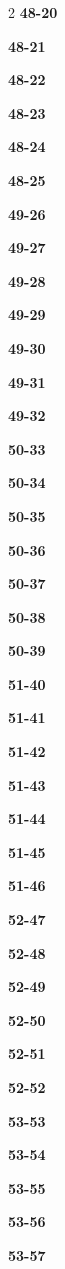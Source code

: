 \documentclass[10pt,a4paper]{article}
\begin{document}
\begin{multicols}{2}
\noindent\textbf{48-20}\ \par
\noindent\textbf{48-21}\ \par
\noindent\textbf{48-22}\ \par
\noindent\textbf{48-23}\ \par
\noindent\textbf{48-24}\ \par
\noindent\textbf{48-25}\ \par
\noindent\textbf{49-26}\ \par
\noindent\textbf{49-27}\ \par
\noindent\textbf{49-28}\ \par
\noindent\textbf{49-29}\ \par
\noindent\textbf{49-30}\ \par
\noindent\textbf{49-31}\ \par
\noindent\textbf{49-32}\ \par
\noindent\textbf{50-33}\ \par
\noindent\textbf{50-34}\ \par
\noindent\textbf{50-35}\ \par
\noindent\textbf{50-36}\ \par
\noindent\textbf{50-37}\ \par
\noindent\textbf{50-38}\ \par
\noindent\textbf{50-39}\ \par
\noindent\textbf{51-40}\ \par
\noindent\textbf{51-41}\ \par
\noindent\textbf{51-42}\ \par
\noindent\textbf{51-43}\ \par
\noindent\textbf{51-44}\ \par
\noindent\textbf{51-45}\ \par
\noindent\textbf{51-46}\ \par
\noindent\textbf{52-47}\ \par
\noindent\textbf{52-48}\ \par
\noindent\textbf{52-49}\ \par
\noindent\textbf{52-50}\ \par
\noindent\textbf{52-51}\ \par
\noindent\textbf{52-52}\ \par
\noindent\textbf{53-53}\ \par
\noindent\textbf{53-54}\ \par
\noindent\textbf{53-55}\ \par
\noindent\textbf{53-56}\ \par
\noindent\textbf{53-57}\ \par

\end{multicols}
\end{document}
